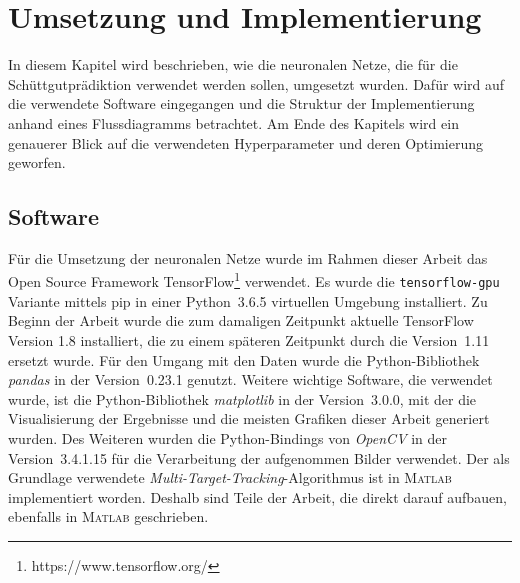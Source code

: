 \chapter{Umsetzung und Implementierung}
\label{cap:impl}

In diesem Kapitel wird beschrieben, wie die neuronalen Netze, die für die Schüttgut\-prädiktion verwendet werden sollen,
umgesetzt wurden.
Dafür wird auf die verwendete Software eingegangen und die Struktur der Implementierung anhand eines Flussdiagramms betrachtet.
Am Ende des Kapitels wird ein genauerer Blick auf die verwendeten Hyperparameter und deren Optimierung geworfen.



\section{Software}


Für die Umsetzung der neuronalen Netze wurde im Rahmen dieser Arbeit 
das Open Source Framework TensorFlow\footnote{https://www.tensorflow.org/} verwendet.
Es wurde die \texttt{tensorflow-gpu} Variante mittels pip in einer Python~3.6.5 virtuellen Umgebung installiert.
Zu Beginn der Arbeit wurde die zum damaligen Zeitpunkt aktuelle TensorFlow Version 1.8 installiert, die zu einem späteren Zeitpunkt durch die Version~1.11 ersetzt wurde.
Für den Umgang mit den Daten wurde die Python-Bibliothek \textit{pandas} in der Version~0.23.1 genutzt.
Weitere wichtige Software, die verwendet wurde,
ist die Python-Bibliothek \textit{matplotlib} in der Version~3.0.0, mit der die Visualisierung der Ergebnisse und die meisten Grafiken dieser Arbeit generiert wurden.
Des Weiteren wurden die Python-Bindings von \textit{OpenCV} in der Version~3.4.1.15 für die Verarbeitung der aufgenommen Bilder verwendet.
Der als Grundlage verwendete \textit{Multi-Target-Tracking}-Algorithmus ist in \textsc{Matlab} implementiert worden. 
Deshalb sind Teile der Arbeit, die direkt darauf aufbauen, ebenfalls in \textsc{Matlab} geschrieben.

